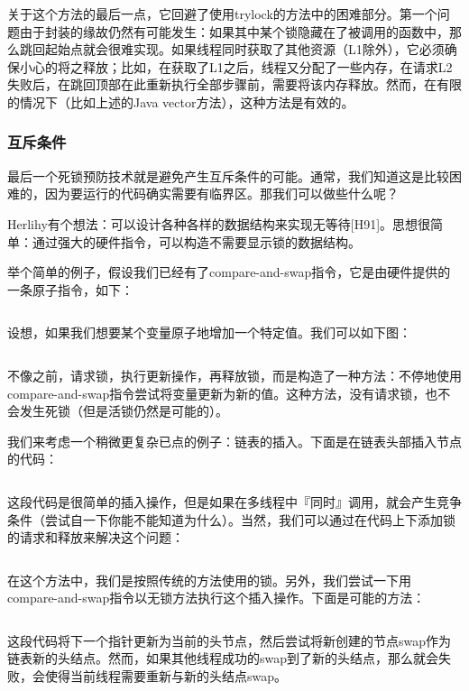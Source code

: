 关于这个方法的最后一点，它回避了使用trylock的方法中的困难部分。第一个问题由于封装的缘故仍然有可能发生：如果其中某个锁隐藏在了被调用的函数中，那么跳回起始点就会很难实现。如果线程同时获取了其他资源（L1除外），它必须确保小心的将之释放；比如，在获取了L1之后，线程又分配了一些内存，在请求L2失败后，在跳回顶部在此重新执行全部步骤前，需要将该内存释放。然而，在有限的情况下（比如上述的Java vector方法），这种方法是有效的。

\subsubsection*{互斥条件}
最后一个死锁预防技术就是避免产生互斥条件的可能。通常，我们知道这是比较困难的，因为要运行的代码确实需要有临界区。那我们可以做些什么呢？

Herlihy有个想法：可以设计各种各样的数据结构来实现无等待[H91]。思想很简单：通过强大的硬件指令，可以构造不需要显示锁的数据结构。

举个简单的例子，假设我们已经有了compare-and-swap指令，它是由硬件提供的一条原子指令，如下：
\begin{verbatim}
\end{verbatim}


设想，如果我们想要某个变量原子地增加一个特定值。我们可以如下图：
\begin{verbatim}
\end{verbatim}

不像之前，请求锁，执行更新操作，再释放锁，而是构造了一种方法：不停地使用compare-and-swap指令尝试将变量更新为新的值。这种方法，没有请求锁，也不会发生死锁（但是活锁仍然是可能的）。

我们来考虑一个稍微更复杂已点的例子：链表的插入。下面是在链表头部插入节点的代码：
\begin{verbatim}
\end{verbatim}

这段代码是很简单的插入操作，但是如果在多线程中『同时』调用，就会产生竞争条件（尝试自一下你能不能知道为什么）。当然，我们可以通过在代码上下添加锁的请求和释放来解决这个问题：
\begin{verbatim}
\end{verbatim}

在这个方法中，我们是按照传统的方法使用的锁。另外，我们尝试一下用compare-and-swap指令以无锁方法执行这个插入操作。下面是可能的方法：
\begin{verbatim}
\end{verbatim}
这段代码将下一个指针更新为当前的头节点，然后尝试将新创建的节点swap作为链表新的头结点。然而，如果其他线程成功的swap到了新的头结点，那么就会失败，会使得当前线程需要重新与新的头结点swap。

